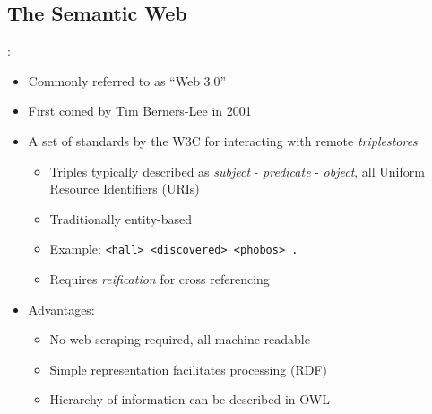\documentclass[logoontitle,tabu,supertabular,aspectratio=43]{preney-uwindsor-beamer}
\begin{document}
    \subsection{The Semantic Web}
    \begin{frame}{\insertsection: \insertsubsection}
        \begin{itemize}
            \item Commonly referred to as ``Web 3.0''
            \item First coined by Tim Berners-Lee in 2001 \cite{berners2001semantic}
            \item A set of standards by the W3C for interacting with remote {\em triplestores} \cite{w3csemanticweb}
            \begin{itemize}
                \item Triples typically described as {\em subject} - {\em predicate} - {\em object}, all Uniform Resource Identifiers (URIs)
                \item Traditionally entity-based
                \item Example: \texttt{<hall> <discovered> <phobos> .}
                \item Requires {\em reification} for cross referencing
            \end{itemize}
            \item Advantages:
            \begin{itemize}
                \item No web scraping required, all machine readable
                \item Simple representation facilitates processing (RDF) \cite{w3c}
                \item Hierarchy of information can be described in OWL \cite{mcguinness2004owl}
            \end{itemize}
        \end{itemize}
    \end{frame}

\end{document}
